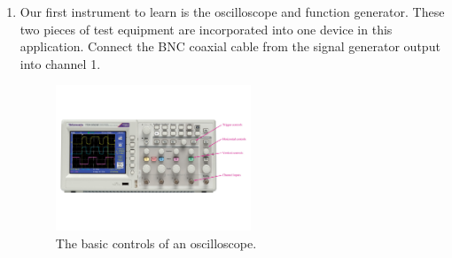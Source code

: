 \documentclass{article}
\begin{document}
\begin{enumerate}
\item Our first instrument to learn is the oscilloscope and function generator.  These two pieces of test equipment are incorporated into one device in this application.  Connect the BNC coaxial cable from the signal generator output into channel 1.
\begin{figure}
\centering
\includegraphics[width=0.55\textwidth,trim=0cm 5cm 0cm 5cm,clip=true]{Scope.pdf}
\caption{\label{fig:scope} The basic controls of an oscilloscope.}
\end{figure}
\end{enumerate}
\end{document}
